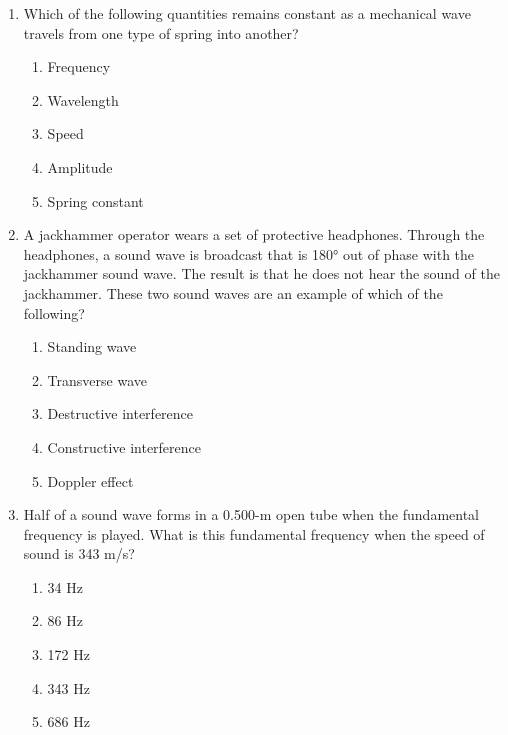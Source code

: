 \documentclass{../../../oss-apphys}
\begin{document}
\begin{multicols}{2}
\begin{enumerate}[leftmargin=18pt]
  \item Which of the following quantities remains constant as a mechanical
    wave travels from one type of spring into another?
    \begin{enumerate}[nosep,leftmargin=18pt,label=(\Alph*)]
    \item Frequency
    \item Wavelength
    \item Speed
    \item Amplitude
    \item Spring constant
    \end{enumerate}
    
  \item A jackhammer operator wears a set of protective headphones. Through the
    headphones, a sound wave is broadcast that is \ang{180} out of phase with
    the jackhammer sound wave. The result is that he does not hear the sound of
    the jackhammer. These two sound waves are an example of which of the
    following?
    \begin{enumerate}[nosep,leftmargin=18pt,label=(\Alph*)]
    \item Standing wave
    \item Transverse wave
    \item Destructive interference
    \item Constructive interference
    \item Doppler effect
    \end{enumerate}
    \vspace{.7in}
    
  \item Half of a sound wave forms in a 0.500-m open tube when the
    fundamental frequency is played. What is this fundamental frequency
    when the speed of sound is 343 m/s?
    \begin{enumerate}[nosep,leftmargin=18pt,label=(\Alph*)]
    \item 34 Hz
    \item 86 Hz
    \item 172 Hz
    \item 343 Hz
    \item 686 Hz
    \end{enumerate}
    \columnbreak
    

\end{enumerate}
\end{multicols}
\end{document}
